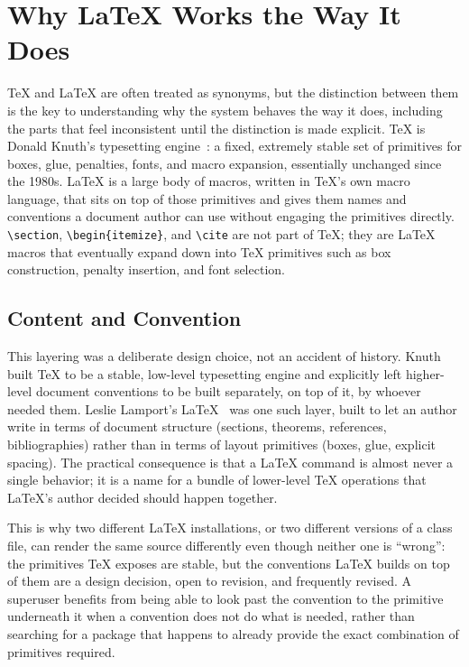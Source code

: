 \hypertarget{chapter-2-why-latex-works-the-way-it-does}{%
\chapter{Why LaTeX Works the Way It Does}\label{chapter-2-why-latex-works-the-way-it-does}}

TeX and LaTeX are often treated as synonyms, but the distinction between them is the key to understanding why the system behaves the way it does, including the parts that feel inconsistent until the distinction is made explicit. TeX is Donald Knuth's typesetting engine~\cite{knuth1984texbook}: a fixed, extremely stable set of primitives for boxes, glue, penalties, fonts, and macro expansion, essentially unchanged since the 1980s. LaTeX is a large body of macros, written in TeX's own macro language, that sits on top of those primitives and gives them names and conventions a document author can use without engaging the primitives directly. \texttt{\textbackslash{}section}, \texttt{\textbackslash{}begin\{itemize\}}, and \texttt{\textbackslash{}cite} are not part of TeX; they are LaTeX macros that eventually expand down into TeX primitives such as box construction, penalty insertion, and font selection.

\hypertarget{content-and-convention}{%
\section{Content and Convention}\label{content-and-convention}}

This layering was a deliberate design choice, not an accident of history. Knuth built TeX to be a stable, low-level typesetting engine and explicitly left higher-level document conventions to be built separately, on top of it, by whoever needed them. Leslie Lamport's LaTeX~\cite{lamport1994latex} was one such layer, built to let an author write in terms of document structure (sections, theorems, references, bibliographies) rather than in terms of layout primitives (boxes, glue, explicit spacing). The practical consequence is that a LaTeX command is almost never a single behavior; it is a name for a bundle of lower-level TeX operations that LaTeX's author decided should happen together.

This is why two different LaTeX installations, or two different versions of a class file, can render the same source differently even though neither one is ``wrong'': the primitives TeX exposes are stable, but the conventions LaTeX builds on top of them are a design decision, open to revision, and frequently revised. A superuser benefits from being able to look past the convention to the primitive underneath it when a convention does not do what is needed, rather than searching for a package that happens to already provide the exact combination of primitives required.

